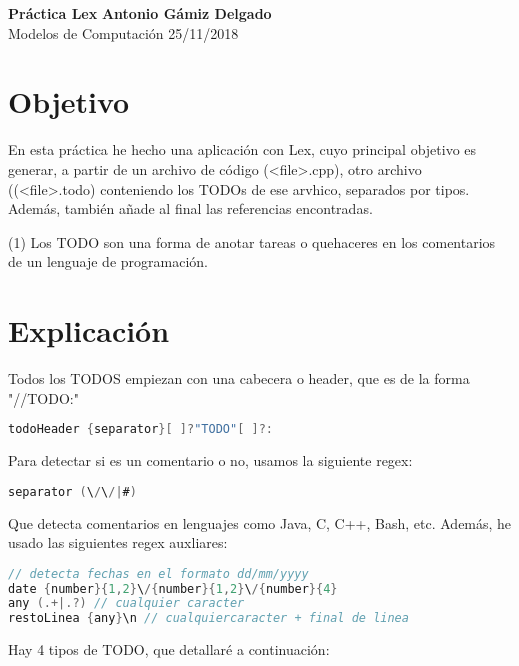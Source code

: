 \documentclass[a4paper, 11pt]{article}
\begin{document}
\noindent
\large\textbf{Práctica Lex} \hfill \textbf{Antonio Gámiz Delgado} \\
\normalsize Modelos de Computación \hfill 25/11/2018

\section*{Objetivo}

En esta práctica he hecho una aplicación con Lex, cuyo principal objetivo es generar, a partir de un archivo de código (\textless file\textgreater.cpp), otro archivo ((\textless file\textgreater.todo) conteniendo los TODOs de ese arvhico, separados por tipos. Además, también añade al final las referencias encontradas.

(1) Los TODO son una forma de anotar tareas o quehaceres en los comentarios de un lenguaje de programación.

\section*{Explicación}

Todos los TODOS empiezan con una cabecera o header, que es de la forma "//TODO:"
\begin{lstlisting}[language=C]
todoHeader {separator}[ ]?"TODO"[ ]?:
\end{lstlisting}

Para detectar si es un comentario o no, usamos la siguiente regex:
\begin{lstlisting}[language=C]
separator (\/\/|#)
\end{lstlisting}
Que detecta comentarios en lenguajes como Java, C, C++, Bash, etc. Además, he usado las siguientes regex auxliares:
\begin{lstlisting}[language=C]
// detecta fechas en el formato dd/mm/yyyy
date {number}{1,2}\/{number}{1,2}\/{number}{4}
any (.+|.?) // cualquier caracter
restoLinea {any}\n // cualquiercaracter + final de linea
\end{lstlisting}


Hay 4 tipos de TODO, que detallaré a continuación:
\end{document}
